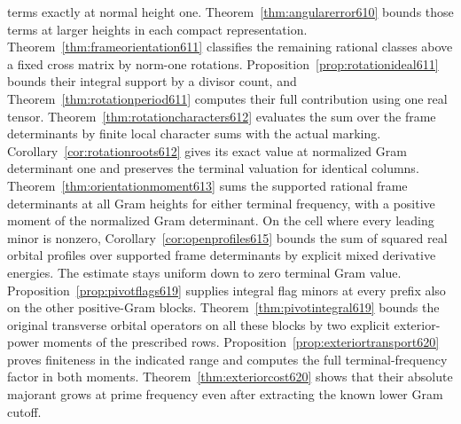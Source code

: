 \documentclass[a4paper,11pt]{article}
\theoremstyle{definition}
\theoremstyle{remark}
\numberwithin{equation}{section}
\begin{document}
terms exactly at normal height one. Theorem~\ref{thm:angularerror610} bounds those terms at larger heights in each compact representation. Theorem~\ref{thm:frameorientation611} classifies the remaining rational classes above a fixed cross matrix by norm-one rotations. Proposition~\ref{prop:rotationideal611} bounds their integral support by a divisor count, and Theorem~\ref{thm:rotationperiod611} computes their full contribution using one real tensor. Theorem~\ref{thm:rotationcharacters612} evaluates the sum over the frame determinants by finite local character sums with the actual marking. Corollary~\ref{cor:rotationroots612} gives its exact value at normalized Gram determinant one and preserves the terminal valuation for identical columns. Theorem~\ref{thm:orientationmoment613} sums the supported rational frame determinants at all Gram heights for either terminal frequency, with a positive moment of the normalized Gram determinant. On the cell where every leading minor is nonzero, Corollary~\ref{cor:openprofiles615} bounds the sum of squared real orbital profiles over supported frame determinants by explicit mixed derivative energies. The estimate stays uniform down to zero terminal Gram value. Proposition~\ref{prop:pivotflags619} supplies integral flag minors at every prefix also on the other positive-Gram blocks. Theorem~\ref{thm:pivotintegral619} bounds the original transverse orbital operators on all these blocks by two explicit exterior-power moments of the prescribed rows. Proposition~\ref{prop:exteriortransport620} proves finiteness in the indicated range and computes the full terminal-frequency factor in both moments. Theorem~\ref{thm:exteriorcost620} shows that their absolute majorant grows at prime frequency even after extracting the known lower Gram cutoff.
\end{document}
